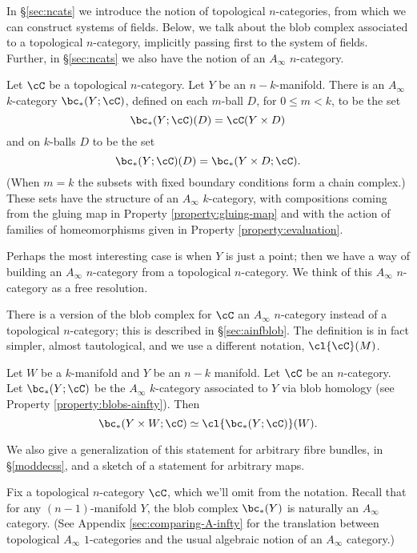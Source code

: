 In \S \ref{sec:ncats} we introduce the notion of topological $n$-categories, from which we can construct systems of fields. Below, we talk about the blob complex associated to a topological $n$-category, implicitly passing first to the system of fields. Further, in \S \ref{sec:ncats} we also have the notion of an $A_\infty$ $n$-category.

\begin{property}
\label{property:blobs-ainfty}
Let $\cC$ be  a topological $n$-category.  Let $Y$ be an $n{-}k$-manifold. 
There is an $A_\infty$ $k$-category $\bc_*(Y;\cC)$, defined on each $m$-ball $D$, for $0 \leq m < k$, to be the set $$\bc_*(Y;\cC)(D) = \cC(Y \times D)$$ and on $k$-balls $D$ to be the set $$\bc_*(Y;\cC)(D) = \bc_*(Y \times D; \cC).$$ (When $m=k$ the subsets with fixed boundary conditions form a chain complex.) These sets have the structure of an $A_\infty$ $k$-category, with compositions coming from the gluing map in Property \ref{property:gluing-map} and with the action of families of homeomorphisms given in Property \ref{property:evaluation}.
\end{property}
\begin{rem}
Perhaps the most interesting case is when $Y$ is just a point; then we have a way of building an $A_\infty$ $n$-category from a topological $n$-category. We think of this $A_\infty$ $n$-category as a free resolution.
\end{rem}

There is a version of the blob complex for $\cC$ an $A_\infty$ $n$-category
instead of a topological $n$-category; this is described in \S \ref{sec:ainfblob}. The definition is in fact simpler, almost tautological, and we use a different notation, $\cl{\cC}(M)$.

\begin{property}
\label{property:product}
Let $W$ be a $k$-manifold and $Y$ be an $n-k$ manifold. Let $\cC$ be an $n$-category.
Let $\bc_*(Y;\cC)$ be the $A_\infty$ $k$-category associated to $Y$ via blob homology (see Property \ref{property:blobs-ainfty}).
Then
\[
	\bc_*(Y\times W; \cC) \simeq \cl{\bc_*(Y;\cC)}(W).
\]
\end{property}
We also give a generalization of this statement for arbitrary fibre bundles, in \S \ref{moddecss}, and a sketch of a statement for arbitrary maps.

Fix a topological $n$-category $\cC$, which we'll omit from the notation. Recall that for any $(n-1)$-manifold $Y$, the blob complex $\bc_*(Y)$ is naturally an $A_\infty$ category. (See Appendix \ref{sec:comparing-A-infty} for the translation between topological $A_\infty$ $1$-categories and the usual algebraic notion of an $A_\infty$ category.)

